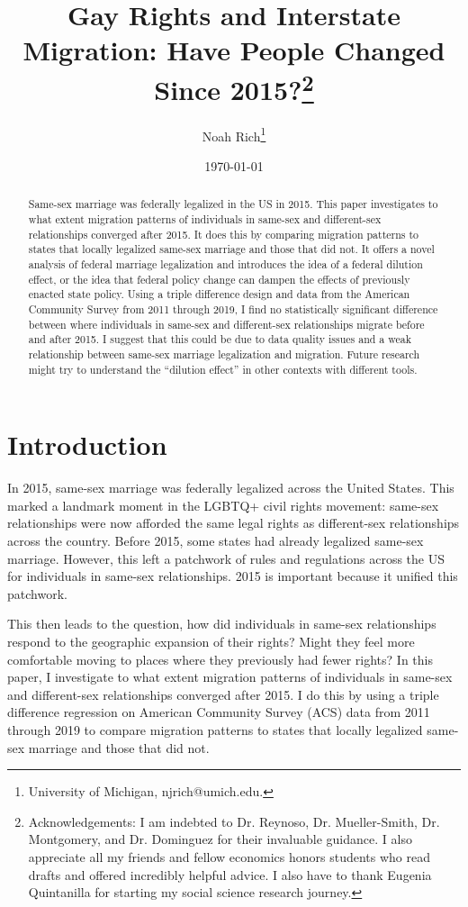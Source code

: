 \documentclass[12pt,letterpaper]{article}
\title{Gay Rights and Interstate Migration: Have People Changed Since 2015?\footnote{Acknowledgements: I am indebted to Dr. Reynoso, Dr. Mueller-Smith, Dr. Montgomery, and Dr. Dominguez for their invaluable guidance. I also appreciate all my friends and fellow economics honors students who read drafts and offered incredibly helpful advice. I also have to thank Eugenia Quintanilla for starting my social science research journey.}}
\author{Noah Rich\footnote{University of Michigan, njrich@umich.edu.}}
\date{\today}
\begin{document}
\maketitle


\begin{abstract}
Same-sex marriage was federally legalized in the US in 2015. This paper investigates to what extent migration patterns of individuals in same-sex and different-sex relationships converged after 2015. It does this by comparing migration patterns to states that locally legalized same-sex marriage and those that did not. It offers a novel analysis of federal marriage legalization and introduces the idea of a federal dilution effect, or the idea that federal policy change can dampen the effects of previously enacted state policy. Using a triple difference design and data from the American Community Survey from 2011 through 2019, I find no statistically significant difference between where individuals in same-sex and different-sex relationships migrate before and after 2015. I suggest that this could be due to data quality issues and a weak relationship between same-sex marriage legalization and migration. Future research might try to understand the “dilution effect” in other contexts with different tools.
\end{abstract}

\newpage

\section{Introduction}

In 2015, same-sex marriage was federally legalized across the United States. This marked a landmark moment in the LGBTQ+ civil rights movement: same-sex relationships were now afforded the same legal rights as different-sex relationships across the country. Before 2015, some states had already legalized same-sex marriage. However, this left a patchwork of rules and regulations across the US for individuals in same-sex relationships. 2015 is important because it unified this patchwork.

This then leads to the question, how did individuals in same-sex relationships respond to the geographic expansion of their rights? Might they feel more comfortable moving to places where they previously had fewer rights? In this paper, I investigate to what extent migration patterns of individuals in same-sex and different-sex relationships converged after 2015. I do this by using a triple difference regression on American Community Survey (ACS) data from 2011 through 2019 to compare migration patterns to states that locally legalized same-sex marriage and those that did not. 
\end{document}
